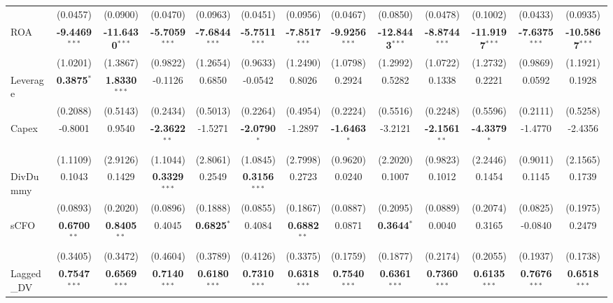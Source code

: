 \documentclass[11pt,a4paper]{article}
\begin{document}
\begin{table}[htbp]
\begin{tabular}{lcccccccccccc}
 & (0.0457) & (0.0900) & (0.0470) & (0.0963) & (0.0451) & (0.0956) & (0.0467) & (0.0850) & (0.0478) & (0.1002) & (0.0433) & (0.0935) \\
ROA & \textbf{-9.4469}$^{***}$ & \textbf{-11.6430}$^{***}$ & \textbf{-5.7059}$^{***}$ & \textbf{-7.6844}$^{***}$ & \textbf{-5.7511}$^{***}$ & \textbf{-7.8517}$^{***}$ & \textbf{-9.9256}$^{***}$ & \textbf{-12.8443}$^{***}$ & \textbf{-8.8744}$^{***}$ & \textbf{-11.9197}$^{***}$ & \textbf{-7.6375}$^{***}$ & \textbf{-10.5867}$^{***}$ \\
 & (1.0201) & (1.3867) & (0.9822) & (1.2654) & (0.9633) & (1.2490) & (1.0798) & (1.2992) & (1.0722) & (1.2732) & (0.9869) & (1.1921) \\
Leverage & \textbf{0.3875}$^{*}$ & \textbf{1.8330}$^{***}$ & -0.1126 & 0.6850 & -0.0542 & 0.8026 & 0.2924 & 0.5282 & 0.1338 & 0.2221 & 0.0592 & 0.1928 \\
 & (0.2088) & (0.5143) & (0.2434) & (0.5013) & (0.2264) & (0.4954) & (0.2224) & (0.5516) & (0.2248) & (0.5596) & (0.2111) & (0.5258) \\
Capex & -0.8001 & 0.9540 & \textbf{-2.3622}$^{**}$ & -1.5271 & \textbf{-2.0790}$^{*}$ & -1.2897 & \textbf{-1.6463}$^{*}$ & -3.2121 & \textbf{-2.1561}$^{**}$ & \textbf{-4.3379}$^{*}$ & -1.4770 & -2.4356 \\
 & (1.1109) & (2.9126) & (1.1044) & (2.8061) & (1.0845) & (2.7998) & (0.9620) & (2.2020) & (0.9823) & (2.2446) & (0.9011) & (2.1565) \\
DivDummy & 0.1043 & 0.1429 & \textbf{0.3329}$^{***}$ & 0.2549 & \textbf{0.3156}$^{***}$ & 0.2723 & 0.0240 & 0.1007 & 0.1012 & 0.1454 & 0.1145 & 0.1739 \\
 & (0.0893) & (0.2020) & (0.0896) & (0.1888) & (0.0855) & (0.1867) & (0.0887) & (0.2095) & (0.0889) & (0.2074) & (0.0825) & (0.1975) \\
sCFO & \textbf{0.6700}$^{**}$ & \textbf{0.8405}$^{**}$ & 0.4045 & \textbf{0.6825}$^{*}$ & 0.4084 & \textbf{0.6882}$^{**}$ & 0.0871 & \textbf{0.3644}$^{*}$ & 0.0040 & 0.3165 & -0.0840 & 0.2479 \\
 & (0.3405) & (0.3472) & (0.4604) & (0.3789) & (0.4126) & (0.3375) & (0.1759) & (0.1877) & (0.2174) & (0.2055) & (0.1937) & (0.1738) \\
Lagged\_DV & \textbf{0.7547}$^{***}$ & \textbf{0.6569}$^{***}$ & \textbf{0.7140}$^{***}$ & \textbf{0.6180}$^{***}$ & \textbf{0.7310}$^{***}$ & \textbf{0.6318}$^{***}$ & \textbf{0.7540}$^{***}$ & \textbf{0.6361}$^{***}$ & \textbf{0.7360}$^{***}$ & \textbf{0.6135}$^{***}$ & \textbf{0.7676}$^{***}$ & \textbf{0.6518}$^{***}$ \\

\end{tabular}
\end{table}
\end{document}
